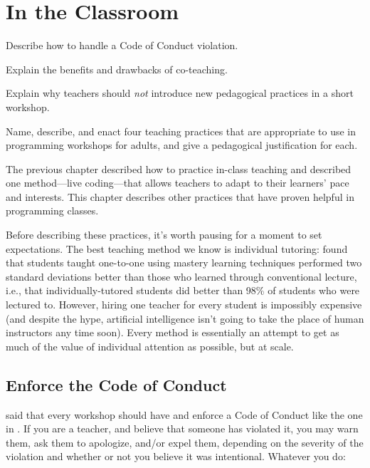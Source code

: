 \chapter{In the Classroom}\label{s:classroom}

\begin{objectives}

\item Describe how to handle a Code of Conduct violation.

\item Explain the benefits and drawbacks of co-teaching.

\item Explain why teachers should \emph{not} introduce new pedagogical
  practices in a short workshop.

\item Name, describe, and enact four teaching practices that are
  appropriate to use in programming workshops for adults, and give a
  pedagogical justification for each.

\end{objectives}

The previous chapter described how to practice in-class teaching and
described one method---live coding---that allows teachers to adapt to
their learners' pace and interests.  This chapter describes other
practices that have proven helpful in programming classes.

Before describing these practices, it's worth pausing for a moment to
set expectations.  The best teaching method we know is individual
tutoring: \cite{Bloo1984} found that students taught one-to-one using
mastery learning techniques performed two standard deviations better
than those who learned through conventional lecture, i.e., that
individually-tutored students did better than 98\% of students who
were lectured to.  However, hiring one teacher for every student is
impossibly expensive (and despite the hype, artificial intelligence
isn't going to take the place of human instructors any time soon).
Every method is essentially an attempt to get as much of the value of
individual attention as possible, but at scale.

\section{Enforce the Code of Conduct}\label{s:classroom-enforce}

 said that every workshop should have and enforce a
Code of Conduct like the one in .  If you are a
teacher, and believe that someone has violated it, you may warn them,
ask them to apologize, and/or expel them, depending on the severity of
the violation and whether or not you believe it was intentional.
Whatever you do:

